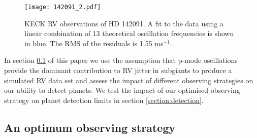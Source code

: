 \documentclass[useAMS, usenatbib]{aastex}
\begin{document}
\begin{figure*}
\begin{center}
\texttt{[image: 142091\_2.pdf]}
\caption{KECK RV observations of HD 142091. A fit to the data using a linear
combination of 13 theoretical oscillation frequencies is shown in blue. The RMS
of the residuals is 1.55 ms$^{-1}$.}
\label{fig:k2_2}
\end{center}
\end{figure*}

In section \textsection \ref{section:method} of this paper we use the
assumption that p-mode oscillations provide the dominant contribution to RV
jitter in subgiants to produce a simulated RV data set and assess the impact
of different observing strategies on our ability to detect planets.
We test the impact of our optimised observing strategy on planet detection
limits in section \textsection \ref{section:detection}.


\subsection{An optimum observing strategy}
\label{section:method}
\end{document}
